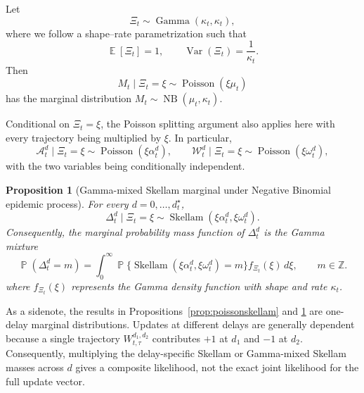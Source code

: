 \documentclass{article}
\newtheorem{proposition}{Proposition}
\theoremstyle{definition}
\theoremstyle{remark}
\newcommand{\Pois}{\operatorname{Poisson}}
\newcommand{\NB}{\operatorname{NB}}
\newcommand{\Sk}{\operatorname{Skellam}}
\newcommand{\E}{\operatorname{\mathbb{E}}}
\newcommand{\Var}{\operatorname{Var}}
\newcommand{\Prb}{\operatorname{\mathbb{P}}}
\begin{document}
Let
\begin{equation}\label{xidef}
\Xi_t\sim\operatorname{Gamma}(\kappa_t,\kappa_t),
\end{equation}
where we follow a shape--rate parametrization such that
\begin{equation}
    \E[\Xi_t]=1,
    \qquad
    \Var(\Xi_t)=\frac{1}{\kappa_t}.
\end{equation}
Then
\begin{equation}\label{nbmixture}
    M_t\mid\Xi_t=\xi
    \sim
    \Pois(\xi\mu_t)
\end{equation}
has the marginal distribution $M_t\sim\NB(\mu_t,\kappa_t)$.

Conditional on $\Xi_t=\xi$, the Poisson splitting argument also applies here with every trajectory being multiplied by $\xi$. In particular,
\begin{equation}
    \mathcal{A}_t^d\mid\Xi_t=\xi
    \sim
    \Pois(\xi\alpha_t^d),
    \qquad
    \mathcal{W}_t^d\mid\Xi_t=\xi
    \sim
    \Pois(\xi\omega_t^d),
\end{equation}
with the two variables being conditionally independent.

\begin{proposition}[Gamma-mixed Skellam marginal under Negative Binomial epidemic process]\label{prop:nbskellam}
For every $d=0,\dots,d_t^{\star}$,
\begin{equation}\label{conditionalnbskellam}
    \Delta_t^d\mid\Xi_t=\xi
    \sim
    \Sk(\xi\alpha_t^d,\xi\omega_t^d).
\end{equation}
Consequently, the marginal probability mass function of $\Delta_t^d$ is the Gamma mixture
\begin{equation}\label{gammamixedskellam}
    \Prb(\Delta_t^d=m)
    =
    \int_0^\infty
    \Prb\{\Sk(\xi\alpha_t^d,\xi\omega_t^d)=m\}
    f_{\Xi_t}(\xi)\,d\xi,
    \qquad m\in\mathbb Z.
\end{equation}
where $f_{\Xi_t}(\xi)$ represents the Gamma density function with shape and rate $\kappa_t$.
\end{proposition}


As a sidenote, the results in Propositions~\ref{prop:poissonskellam} and \ref{prop:nbskellam} are one-delay marginal distributions. Updates at different delays are generally dependent because a single trajectory $W_{t,\tau}^{d_1,d_2}$ contributes $+1$ at $d_1$ and $-1$ at $d_2$. Consequently, multiplying the delay-specific Skellam or Gamma-mixed Skellam masses across $d$ gives a composite likelihood, not the exact joint likelihood for the full update vector.
\end{document}
